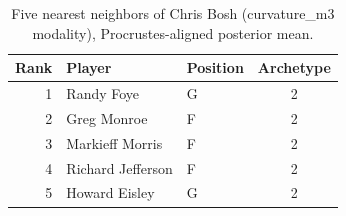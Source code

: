 \begin{table}[htbp]
  \centering\small
  \begin{tabular}{rllc}
    \toprule
    Rank & Player & Position & Archetype \\
    \midrule
    1 & Randy Foye & G & 2 \\
    2 & Greg Monroe & F & 2 \\
    3 & Markieff Morris & F & 2 \\
    4 & Richard Jefferson & F & 2 \\
    5 & Howard Eisley & G & 2 \\
    \bottomrule
  \end{tabular}
  \caption{Five nearest neighbors of Chris Bosh (curvature_m3 modality), Procrustes-aligned posterior mean.}
  \label{tab:Chris_Bosh_neighbors_curvature_m3}
\end{table}

